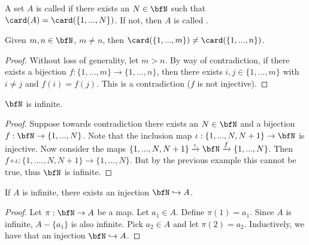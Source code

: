         \begin{definition}
            A set $A$ is called  if there exists an $N \in \bfN$ such that $\card(A) = \card(\{1,...,N\})$. If not, then $A$ is called .
        \end{definition}

        \begin{proposition}
            Given $m,n \in \bfN$, $m \neq n$, then $\card(\{1,...,m\}) \neq \card(\{1,...,n\})$.
        \end{proposition}
            \begin{proof}
                Without loss of generality, let $m > n$. By way of contradiction, if there exists a bijection $f: \{1,...,m\} \rightarrow \{1,...,n\}$, then there exists $i,j \in \{1,...,m\}$ with $i \neq j$ and $f(i) = f(j)$. This is a contradiction ($f$ is not injective).
            \end{proof}

        \begin{proposition}
            $\bfN$ is infinite.
        \end{proposition}
            \begin{proof}
                Suppose towards contradiction there exists an $N \in \bfN$ and a bijection $f:\bfN \rightarrow \{1,...,N\}$. Note that the inclusion map $\iota:\{1,...,N,N+1\} \rightarrow \bfN$ is injective. Now consider the maps $\{1,...,N,N+1\} \xrightarrow{\iota} \bfN \xrightarrow{f} \{1,...,N\}$. Then $f \circ \iota : \{1,....,N,N+1\} \rightarrow \{1,...,N\}$. But by the previous example this cannot be true, thus $\bfN$ is infinite.
            \end{proof}

        \begin{exercise}\label{exercise:infinite-implies-injection}
            If $A$ is infinite, there exists an injection $\bfN \hookrightarrow A$.
        \end{exercise}
            \begin{proof}
                Let $\pi:\bfN \rightarrow A$ be a map. Let $a_1 \in A$. Define $\pi(1) = a_1$. Since $A$ is infinite, $A - \{a_1\}$ is also infinite. Pick $a_2 \in A$ and let $\pi(2) = a_2$. Inductively, we have that an injection $\bfN \hookrightarrow A$.
            \end{proof}

